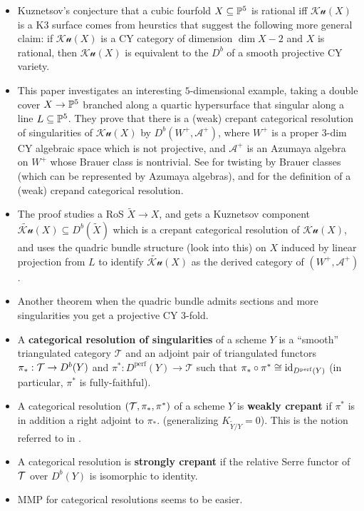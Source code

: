 \documentclass[12pt]{article}
\newcommand{\Ku}{\mathcal{Ku}}
\begin{document}
\begin{itemize}
    \item Kuznetsov's conjecture that a cubic fourfold $X\subseteq \P^5$ is rational iff $\Ku(X)$ is a K3 surface comes from heurstics that suggest the following more general claim: if $\Ku(X)$ is a CY category of dimension $\dim X - 2$ and $X$ is rational, then $\Ku(X)$ is equivalent to the $D^b$ of a smooth projective CY variety. 
    \item This paper investigates an interesting $5$-dimensional example, taking a double cover $X\to \P^5$ branched along a quartic hypersurface that singular along a line $L\subseteq \P^5$. They prove that there is a (weak) crepant categorical resolution of singularities of $\Ku(X)$ by $D^b(W^+,\mathcal{A}^+)$, where $W^+$ is a proper 3-dim CY algebraic space which is not projective, and $\mathcal{A}^+$ is an Azumaya algebra on $W^+$ whose Brauer class is nontrivial. See \cite{Căldăraru_2000} for twisting by Brauer classes (which can be represented by Azumaya algebras), and \cite{Kuznetsov_2015} for the definition of a (weak) crepand categorical resolution.
    \item The proof studies a RoS $\tilde{X}\to X$, and gets a Kuznetsov component $\tilde{\Ku}(X) \subseteq D^b(\tilde{X})$ which is a crepant categorical resolution of $\Ku(X)$, and uses the {\color{red} quadric bundle structure (look into this)} on $X$ induced by linear projection from $L$ to identify $\tilde{\Ku}(X)$ as the derived category of $(W^+,\mathcal{A}^+)$.
    \item Another theorem when the quadric bundle admits sections and more singularities you get a projective CY 3-fold.
\end{itemize}

\cite{Kuznetsov_2015} 
\begin{itemize}
    \item A \textbf{categorical resolution of singularities} of a scheme $Y$ is a ``smooth'' triangulated category $\mathcal{T}$ and an adjoint pair of triangulated functors $\pi_*: \cT \to D^b(Y)$ and $\pi^*: D^{\mathrm{perf}}(Y)\to \mathcal{T}$ such that $\pi_* \circ \pi^* \cong \id_{D^{\mathrm{perf}}(Y)}$ (in particular, $\pi^*$ is fully-faithful).
    \item A categorical resolution $(\cT,\pi_*,\pi^*)$ of a scheme $Y$ is \textbf{weakly crepant} if $\pi^*$ is in addition a right adjoint to $\pi_*$. (generalizing $K_{\tilde{Y}/Y} = 0$). This is the notion referred to in \cite{Cheng_Perry_Zhao_2025}.
    \item A categorical resolution is \textbf{strongly crepant} if the relative Serre functor of $\cT$ over $D^b(Y)$ is isomorphic to identity.
    \item MMP for categorical resolutions seems to be easier.
\end{itemize}
\end{document}
